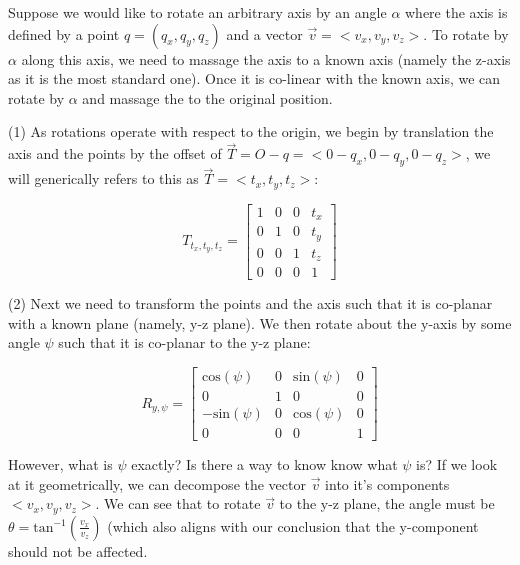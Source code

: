 \documentclass[12pt,letterpaper]{article}
\begin{document}
Suppose we would like to rotate an arbitrary axis by an angle $\alpha$ where the axis is defined by a point $q = (q_x, q_y, q_z)$ and a vector $\overrightarrow{v} = <v_x, v_y, v_z>$. To rotate by $\alpha$ along this axis, we need to massage the axis to a known axis (namely the z-axis as it is the most standard one). Once it is co-linear with the known axis, we can rotate by $\alpha$ and massage the to the original position.

(1) As rotations operate with respect to the origin, we begin by translation the axis and the points by the offset of $\overrightarrow{T} = O-q = <0-q_x, 0-q_y, 0-q_z>$, we will generically refers to this as $\overrightarrow{T} = <t_x, t_y, t_z>$:

\begin{equation}
    T_{t_x, t_y, t_z} =
     \begin{bmatrix}
        1 & 0 & 0 & t_x \\
        0 & 1 & 0 & t_y \\
        0 & 0 & 1 & t_z \\
        0 & 0 & 0 & 1
    \end{bmatrix}
\end{equation}

\newpage

(2) Next we need to transform the points and the axis such that it is co-planar with a known plane (namely, y-z plane). We then rotate about the y-axis by some angle $\psi$ such that it is co-planar to the y-z plane:

\begin{equation}
    R_{y, \psi} =
     \begin{bmatrix}
        \text{cos}(\psi)  & 0 & \text{sin}(\psi) & 0 \\
        0 & 1 & 0 & 0 \\
        -\text{sin}(\psi) & 0 & \text{cos}(\psi) & 0 \\
        0 & 0 & 0 & 1
    \end{bmatrix}
\end{equation}

However, what is $\psi$ exactly? Is there a way to know know what $\psi$ is? If we look at it geometrically, we can decompose the vector $\overrightarrow{v}$ into it's components $<v_x, v_y, v_z>$. We can see that to rotate $\overrightarrow{v}$ to the y-z plane, the angle must be $\theta=\text{tan}^{-1}(\frac{v_x}{v_z})$ (which also aligns with our conclusion that the y-component should not be affected.
\end{document}
